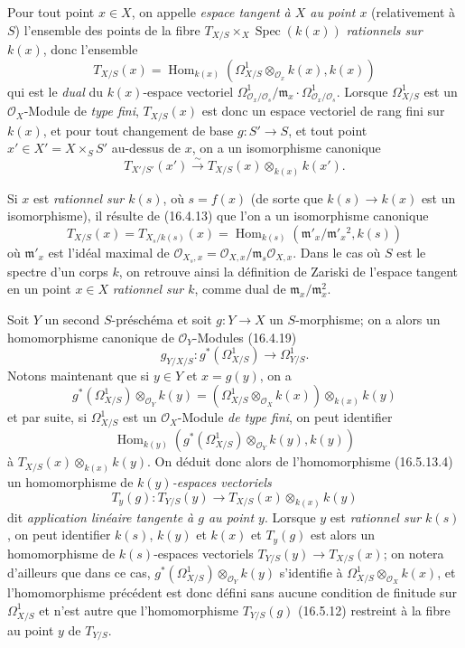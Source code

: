 \begin{env}[16.5.13]
\label{IV.16.5.13}
Pour tout point $x\in X$, on appelle \emph{espace tangent à $X$ au point $x$}
(relativement à $S$) l'ensemble des points de la fibre
$T_{X/S}\times_X\operatorname{Spec}(k(x))$ \emph{rationnels sur $k(x)$}, donc
l'ensemble
\[
  T_{X/S}(x)=
  \operatorname{Hom}_{k(x)}
  (\Omega_{X/S}^1\otimes_{\mathcal{O}_x}k(x),k(x))
  \tag{16.5.13.1}
  \label{IV.16.5.13.1}
\]
qui est le \emph{dual} du $k(x)$-espace vectoriel
$\Omega_{\mathcal{O}_x/\mathcal{O}_s}^1/
\mathfrak{m}_x\cdot\Omega_{\mathcal{O}_x/\mathcal{O}_s}^1$. Lorsque
$\Omega_{X/S}^1$ est un $\mathcal{O}_X$-Module de \emph{type fini},
$T_{X/S}(x)$ est donc un espace vectoriel de rang fini sur $k(x)$, et pour
tout
changement de base $g:S'\to S$, et tout point
$x'\in X'=X\times_S S'$ au-dessus de $x$, on a un isomorphisme canonique
\[
  T_{X'/S'}(x')\xrightarrow{\sim}
  T_{X/S}(x)\otimes_{k(x)}k(x').
  \tag{16.5.13.2}
  \label{IV.16.5.13.2}
\]

Si $x$ est \emph{rationnel sur $k(s)$}, où $s=f(x)$ (de sorte que
$k(s)\to k(x)$ est un isomorphisme), il résulte de (16.4.13) que l'on a un
isomorphisme canonique
\[
  T_{X/S}(x)=T_{X_s/k(s)}(x)
  =\operatorname{Hom}_{k(s)}
  (\mathfrak{m}'_x/\mathfrak{m}'_x{}^2,k(s))
  \tag{16.5.13.3}
  \label{IV.16.5.13.3}
\]
où $\mathfrak{m}'_x$ est l'idéal maximal de
$\mathcal{O}_{X_s,x}=\mathcal{O}_{X,x}/
\mathfrak{m}_s\mathcal{O}_{X,x}$. Dans le cas où $S$ est le spectre d'un corps
$k$, on retrouve ainsi la définition de Zariski de l'espace tangent en un
point $x\in X$ \emph{rationnel sur $k$}, comme dual de
$\mathfrak{m}_x/\mathfrak{m}_x^2$.

Soit $Y$ un second $S$-préschéma et soit $g:Y\to X$ un $S$-morphisme; on a
alors un homomorphisme canonique de $\mathcal{O}_Y$-Modules (16.4.19)
\[
  g_{Y/X/S}:g^*(\Omega_{X/S}^1)\longrightarrow\Omega_{Y/S}^1.
  \tag{16.5.13.4}
  \label{IV.16.5.13.4}
\]
Notons maintenant que si $y\in Y$ et $x=g(y)$, on a
\[
  g^*(\Omega_{X/S}^1)\otimes_{\mathcal{O}_Y}k(y)
  =(\Omega_{X/S}^1\otimes_{\mathcal{O}_X}k(x))
  \otimes_{k(x)}k(y)
\]
et par suite, si $\Omega_{X/S}^1$ est un $\mathcal{O}_X$-Module
\emph{de type fini}, on peut identifier
\[
  \operatorname{Hom}_{k(y)}
  (g^*(\Omega_{X/S}^1)\otimes_{\mathcal{O}_Y}k(y),k(y))
\]
à $T_{X/S}(x)\otimes_{k(x)}k(y)$. On déduit donc alors de l'homomorphisme
(16.5.13.4) un homomorphisme de \emph{$k(y)$-espaces vectoriels}
\[
  T_y(g):T_{Y/S}(y)\longrightarrow
  T_{X/S}(x)\otimes_{k(x)}k(y)
  \tag{16.5.13.5}
  \label{IV.16.5.13.5}
\]
dit \emph{application linéaire tangente à $g$ au point $y$}. Lorsque $y$ est
\emph{rationnel sur $k(s)$}, on peut identifier $k(s)$, $k(y)$ et $k(x)$ et
$T_y(g)$ est alors un homomorphisme de $k(s)$-espaces vectoriels
$T_{Y/S}(y)\to T_{X/S}(x)$; on notera d'ailleurs que dans ce cas,
$g^*(\Omega_{X/S}^1)\otimes_{\mathcal{O}_Y}k(y)$ s'identifie à
$\Omega_{X/S}^1\otimes_{\mathcal{O}_X}k(x)$, et l'homomorphisme précédent est
donc défini sans aucune condition de finitude sur $\Omega_{X/S}^1$ et n'est
autre que l'homomorphisme $T_{Y/S}(g)$ (16.5.12) restreint à la fibre au point
$y$ de $T_{Y/S}$.
\end{env}


